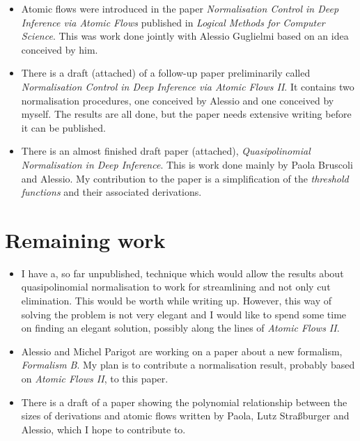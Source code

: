 \documentclass[]{article}
\begin{document}
\begin{itemize}
\item Atomic flows were introduced in the paper \emph{Normalisation Control in Deep Inference via Atomic Flows} published in \emph{Logical Methods for Computer Science}. This was work done jointly with Alessio Guglielmi based on an idea conceived by him.
\item There is a draft (attached) of a follow-up paper preliminarily called \emph{Normalisation Control in Deep Inference via Atomic Flows II}. It contains two normalisation procedures, one conceived by Alessio and one conceived by myself. The results are all done, but the paper needs extensive writing before it can be published.
\item There is an almost finished draft paper (attached), \emph{Quasipolinomial Normalisation in Deep Inference}. This is work done mainly by Paola Bruscoli and Alessio. My contribution to the paper is a simplification of the \emph{threshold functions} and their associated derivations.
\end{itemize}

\section{Remaining work}

\begin{itemize}
\item I have a, so far unpublished, technique which would allow the results about quasipolinomial normalisation to work for streamlining and not only cut elimination. This would be worth while writing up. However, this way of solving the problem is not very elegant and I would like to spend some time on finding an elegant solution, possibly along the lines of \emph{Atomic Flows II}.
\item Alessio and Michel Parigot are working on a paper about a new formalism, \emph{Formalism B}. My plan is to contribute a normalisation result, probably based on \emph{Atomic Flows II}, to this paper.
\item There is a draft of a paper showing the polynomial relationship between the sizes of derivations and atomic flows written by Paola, Lutz Stra\ss{}burger and Alessio, which I hope to contribute to.
\end{itemize}
\end{document}
